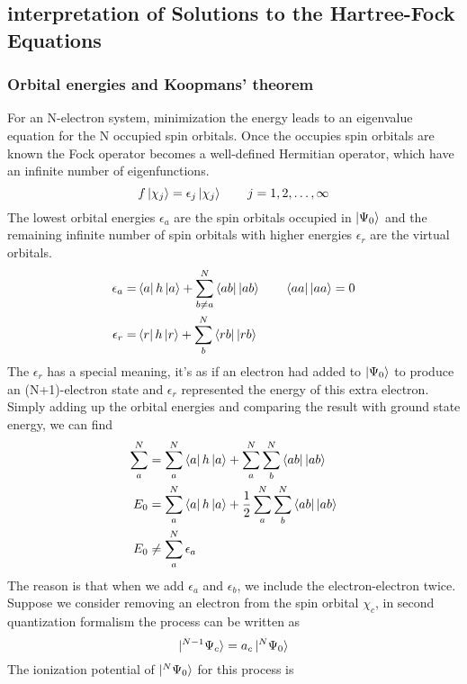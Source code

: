 \documentclass[11pt]{article}
\begin{document}
\subsection{interpretation of Solutions to the Hartree-Fock Equations}
\subsubsection{Orbital energies and Koopmans' theorem}
For an N-electron system, minimization the energy leads to an eigenvalue equation for the N occupied spin orbitals. Once the
occupies spin orbitals are known the Fock operator becomes a well-defined Hermitian operator, which have an infinite number
of eigenfunctions.
\begin{equation}
    f\ket{\chi_j}=\epsilon_j\ket{\chi_j}\qquad j=1,2,\ldots,\infty
\end{equation}
The lowest orbital energies $\epsilon_a$ are the spin orbitals occupied in $\ket{\Psi_0}$ and the remaining infinite number of spin orbitals
with higher energies $\epsilon_r$ are the virtual orbitals. 
\begin{align}
    \epsilon_a=&\bra{a}h\ket{a}+\sum_{b\neq a}^{N}\bra{ab}\ket{ab} \qquad\bra{aa}\ket{aa}=0 \\
    \epsilon_r=&\bra{r}h\ket{r}+\sum_{b}^{N}\bra{rb}\ket{rb}
\end{align}
The $\epsilon_r$ has a special meaning, it's as if an electron had added to $\ket{\Psi_0}$ to produce an (N+1)-electron state and
$\epsilon_r$ represented the energy of this extra electron.\\
Simply adding up the orbital energies and comparing the result with ground state energy, we can find
\begin{align}
    \sum_{a}^{N}&=\sum_{a}^{N}\bra{a}h\ket{a}+\sum_{a}^{N}\sum_{b}^{N}\bra{ab}\ket{ab} \notag \\
    E_0&=\sum_{a}^{N}\bra{a}h\ket{a}+\frac{1}{2}\sum_{a}^{N}\sum_{b}^{N}\bra{ab}\ket{ab} \notag \\
    E_0&\neq\sum_{a}^{N}\epsilon_a
\end{align}
The reason is that when we add $\epsilon_a$ and $\epsilon_b$, we include the electron-electron twice.
Suppose we consider removing an electron from the spin orbital $\chi_c$, in second quantization formalism
the process can be written as
\begin{equation}
    \ket{ ^{N-1}\Psi_c}=a_c\ket{ ^N\Psi_0}
\end{equation}
The ionization potential of $\ket{ ^N\Psi_0}$ for this process is
\end{document}
